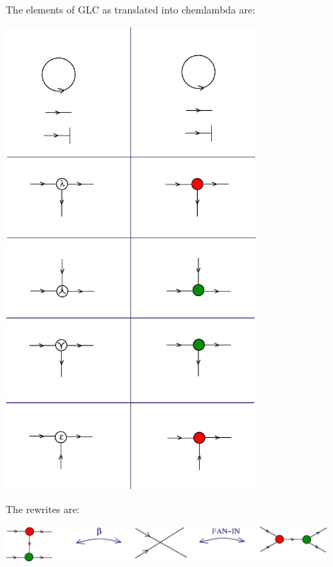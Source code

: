 \documentclass{article}
\begin{document}
The elements of GLC as translated into chemlambda are:




\vspace{.5cm}
 
\centerline{\includegraphics[width=0.7\textwidth]{../img/chemical-concrete-machine/convention_1.jpg}
}
\vspace{.5cm}



The rewrites are:


\vspace{.5cm}
 
\centerline{\includegraphics[width=0.9\textwidth]{../img/chemical-concrete-machine/convention_2.jpg}
}
\vspace{.5cm}
\end{document}
